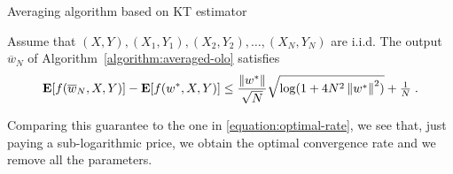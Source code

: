 \begin{algorithm}[t]
\caption{Averaging algorithm based on KT estimator \label{algorithm:averaged-olo}}
\begin{algorithmic}[1]
{
\ENDFOR
{}
}
\end{algorithmic}
\end{algorithm}
%
\begin{theorem}
Assume that $(X, Y), (X_1, Y_1), (X_2, Y_2), \dots, (X_N,Y_N)$ are i.i.d.  The
output $\overline{w}_N$ of Algorithm~\ref{algorithm:averaged-olo} satisfies
$$
\operatorname*{\mathbf{E}}[f(\overline{w}_N,X,Y)] - \operatorname*{\mathbf{E}}[f(w^*,X,Y)] \le \frac{\left\|{w^*}\right\|}{\sqrt{N}} \sqrt{\log(1+4 N^2 \left\|{w^*}\right\|^2)} + \tfrac{1}{N} \; .
$$
\end{theorem}
%
Comparing this guarantee to the one in \eqref{equation:optimal-rate}, we see
that, just paying a sub-logarithmic price, we obtain the optimal convergence
rate and we remove all the parameters.
